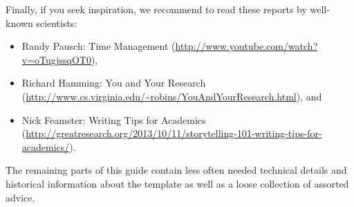 Finally, if you seek inspiration, we recommend to read these reports by well-known scientists:
\begin{itemize}
\item Randy Pausch: Time Management (\url{http://www.youtube.com/watch?v=oTugjssqOT0}),
\item Richard Hamming: You and Your Research (\url{http://www.cs.virginia.edu/~robins/YouAndYourResearch.html}), and
\item Nick Feamster: Writing Tips for Academics (\url{http://greatresearch.org/2013/10/11/storytelling-101-writing-tips-for-academics/}).
\end{itemize}

The remaining parts of this guide contain less often needed technical details and historical information about the template as well as a loose collection of assorted advice.